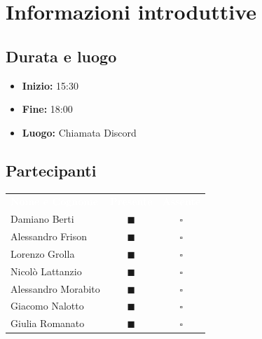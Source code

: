 \documentclass[a4paper, 11pt]{article}
\begin{document}

\section{Informazioni introduttive}

\subsection{Durata e luogo}
\begin{itemize}
    \item \textbf{Inizio:} 15:30
    \item \textbf{Fine:} 18:00
    \item \textbf{Luogo:} Chiamata Discord
\end{itemize}

\subsection{Partecipanti}
\begin{center}
    \begin{tabular}{>{\raggedright\arraybackslash}p{6cm} c c}
        \rowcolor{AccentColor}
        \textcolor{white}{\textbf{Nome e Cognome}} & 
        \textcolor{white}{\textbf{Presente}} & 
        \textcolor{white}{\textbf{Assente}} \\
        
        Damiano Berti     & \textcolor{AccentColor}{$\blacksquare$}    & $\square$        \\
        Alessandro Frison     & \textcolor{AccentColor}{$\blacksquare$}    & $\square$        \\
        Lorenzo Grolla     & \textcolor{AccentColor}{$\blacksquare$}    & $\square$        \\
        Nicolò Lattanzio    & \textcolor{AccentColor}{$\blacksquare$}    & $\square$        \\
        Alessandro Morabito   & \textcolor{AccentColor}{$\blacksquare$}    & $\square$        \\
        Giacomo Nalotto   & \textcolor{AccentColor}{$\blacksquare$}    & $\square$        \\
        Giulia Romanato   & \textcolor{AccentColor}{$\blacksquare$}    & $\square$        \\
    \end{tabular}
\end{center}
\end{document}
